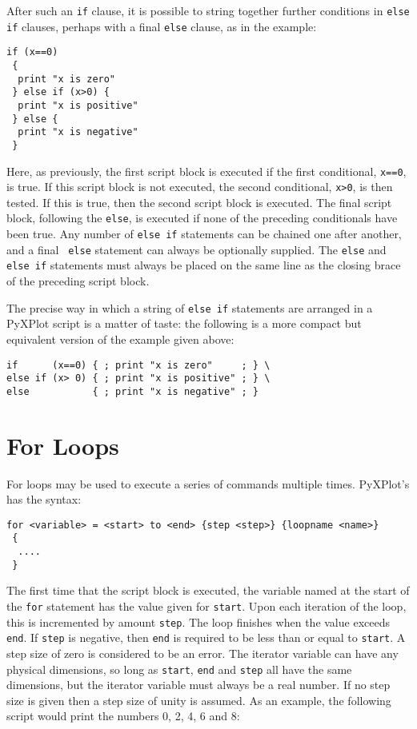 After such an {\tt if} clause, it is possible to string together further
conditions in {\tt else if} clauses, perhaps with a final {\tt else} clause, as
in the example:

\begin{verbatim}
if (x==0)
 {
  print "x is zero"
 } else if (x>0) {
  print "x is positive"
 } else {
  print "x is negative"
 }
\end{verbatim}

Here, as previously, the first script block is executed if the first
conditional, {\tt x==0}, is true. If this script block is not executed, the
second conditional, {\tt x>0}, is then tested. If this is true, then the second
script block is executed.  The final script block, following the {\tt else}, is
executed if none of the preceding conditionals have been true. Any number of
{\tt else if} statements can be chained one after another, and a final {\tt
else} statement can always be optionally supplied. The {\tt else} and {\tt else
if} statements must always be placed on the same line as the closing brace of
the preceding script block.

The precise way in which a string of {\tt else if} statements are arranged in a
PyXPlot script is a matter of taste: the following is a more compact but
equivalent version of the example given above:

\begin{verbatim}
if      (x==0) { ; print "x is zero"     ; } \
else if (x> 0) { ; print "x is positive" ; } \
else           { ; print "x is negative" ; }
\end{verbatim}

\section{For Loops}

For loops may be used to execute a series of commands multiple times. PyXPlot's
 has the syntax:

\begin{verbatim}
for <variable> = <start> to <end> {step <step>} {loopname <name>}
 {
  ....
 }
\end{verbatim}

\noindent The first time that the script block is executed, the variable named
at the start of the {\tt for} statement has the value given for {\tt start}.
Upon each iteration of the loop, this is incremented by amount {\tt step}. The
loop finishes when the value exceeds {\tt end}. If {\tt step} is negative, then
{\tt end} is required to be less than or equal to {\tt start}. A step size of
zero is considered to be an error.  The iterator variable can have any physical
dimensions, so long as {\tt start}, {\tt end} and {\tt step} all have the same
dimensions, but the iterator variable must always be a real number. If no step
size is given then a step size of unity is assumed.  As an example, the
following script would print the numbers 0, 2, 4, 6 and 8:

